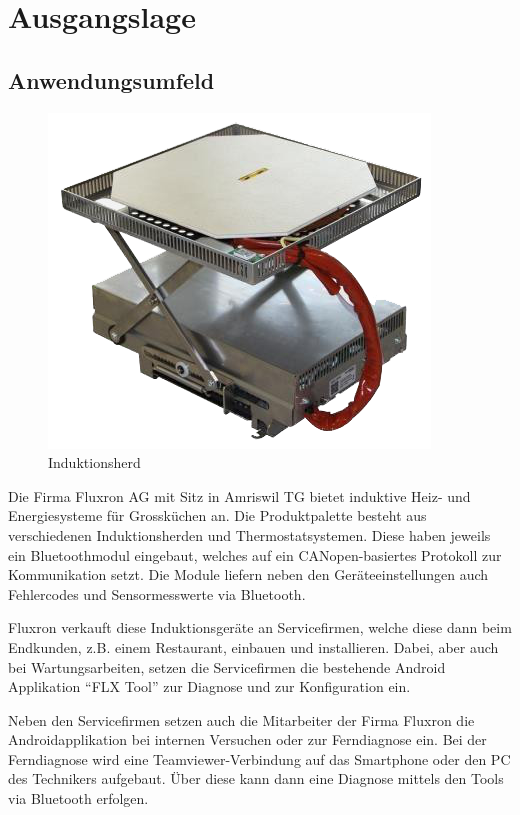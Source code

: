 
\section{Ausgangslage}
\label{sec:Ausgangslage}

\subsection{Anwendungsumfeld}
\label{subsec:Anwendungsumfeld}

\begin{figure}
	\includegraphics[scale=0.4]{analysis/res/einbaugeraete}
	\caption{Induktionsherd}
\end{figure}

Die Firma Fluxron AG mit Sitz in Amriswil TG bietet induktive Heiz- und Energiesysteme für Grossküchen an. Die Produktpalette besteht aus verschiedenen Induktionsherden und Thermostatsystemen. Diese haben jeweils ein Bluetoothmodul eingebaut, welches auf ein CANopen-basiertes Protokoll zur Kommunikation setzt. Die Module liefern neben den Geräteeinstellungen auch Fehlercodes und Sensormesswerte via Bluetooth.

Fluxron verkauft diese Induktionsgeräte an Servicefirmen, welche diese dann beim Endkunden, z.B. einem Restaurant, einbauen und installieren. Dabei, aber auch bei Wartungsarbeiten, setzen die Servicefirmen die bestehende Android Applikation \enquote{FLX Tool} zur Diagnose und zur Konfiguration ein.

Neben den Servicefirmen setzen auch die Mitarbeiter der Firma Fluxron die Androidapplikation bei internen Versuchen oder zur Ferndiagnose ein. Bei der Ferndiagnose wird eine Teamviewer-Verbindung auf das Smartphone oder den PC des Technikers aufgebaut. Über diese kann dann eine Diagnose mittels den Tools via Bluetooth erfolgen.

